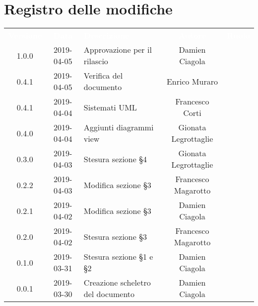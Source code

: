 \section*{Registro delle modifiche}
{
	\renewcommand{\arraystretch}{1.5}
	\centering
	\begin{longtable}{ c c C{6cm} c c }
		\textcolor{white}{\textbf{Versione}} & \textcolor{white}{\textbf{Data}} & \textcolor{white}{\textbf{Descrizione}} & \textcolor{white}{\textbf{Autore}} & \textcolor{white}{\textbf{Ruolo}}\\

		1.0.0 & 
		2019-04-05 &  
		Approvazione per il rilascio &	
		Damien Ciagola &
		\RdP{}  \\	
				
		0.4.1 & 
		2019-04-05 &  
		Verifica del documento &	
		Enrico Muraro &
		\ver{}  \\			
		
		0.4.1 & 
		2019-04-04 &  
		Sistemati UML  &	
		Francesco Corti&
		\reda{}  \\			
		
		0.4.0 & 
		2019-04-04 &  
		Aggiunti diagrammi view &	
		Gionata Legrottaglie&
		\reda{}  \\			
		
		0.3.0 & 
		2019-04-03 &  
		Stesura sezione §4 &	
		Gionata Legrottaglie&
		\reda{}  \\			
		
		0.2.2 & 
		2019-04-03 &  
		Modifica sezione §3 &	
		Francesco Magarotto &
		\reda{}  \\			
		
		0.2.1 & 
		2019-04-02 &  
		Modifica sezione §3 &	
		Damien Ciagola &
		\reda{}  \\		
		
		0.2.0 & 
		2019-04-02 &  
		Stesura sezione §3 &	
		Francesco Magarotto &
		\reda{}  \\	
		
		0.1.0 & 
		2019-03-31 &  
		Stesura sezione §1 e §2 &	
		Damien Ciagola &
		\reda{}  \\
		
		0.0.1 & 
		2019-03-30 &  
		Creazione scheletro del documento&	
		Damien Ciagola  &	
		\reda{}  \\
	\end{longtable}

}